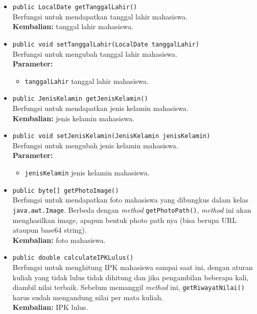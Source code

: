 \begin{itemize}
	\item \texttt{public LocalDate getTanggalLahir()}\\
	Berfungsi untuk mendapatkan tanggal lahir mahasiswa.\\
	\textbf{Kembalian:} tanggal lahir mahasiswa.
	
	\item \texttt{public void setTanggalLahir(LocalDate tanggalLahir)}\\
	Berfungsi untuk mengubah tanggal lahir mahasiswa.\\
        \textbf{Parameter:}
		\begin{itemize}
			\item \texttt{tanggalLahir} tanggal lahir mahasiswa.
		\end{itemize}
		
	\item \texttt{public JenisKelamin getJenisKelamin()}\\
	Berfungsi untuk mendapatkan jenis kelamin mahasiswa.\\
	\textbf{Kembalian:} jenis kelamin mahasiswa.
	
	\item \texttt{public void setJenisKelamin(JenisKelamin jenisKelamin)}\\
	Berfungsi untuk mengubah jenis kelamin mahasiswa.\\
        \textbf{Parameter:}
		\begin{itemize}
			\item \texttt{jenisKelamin} jenis kelamin mahasiswa.
		\end{itemize}
		
	\item \texttt{public byte[] getPhotoImage()}\\
	Berfungsi untuk mendapatkan foto mahasiswa yang dibungkus dalam kelas \texttt{java.awt.Image}. Berbeda dengan \textit{method} \texttt{getPhotoPath()}, \textit{method} ini akan menghasilkan image, apapun bentuk photo path nya (bisa berupa URL ataupun base64 string).\\
	\textbf{Kembalian:} foto mahasiswa.
		
	\item \texttt{public double calculateIPKLulus()}\\
	Berfungsi untuk menghitung IPK mahasiswa sampai saat ini, dengan aturan kuliah yang tidak lulus tidak dihitung dan jika pengambilan beberapa kali, diambil nilai terbaik. Sebelum memanggil \textit{method} ini, \texttt{getRiwayatNilai()} harus sudah mengandung nilai per mata kuliah.\\
	\textbf{Kembalian:} IPK lulus.
		

\end{itemize}
